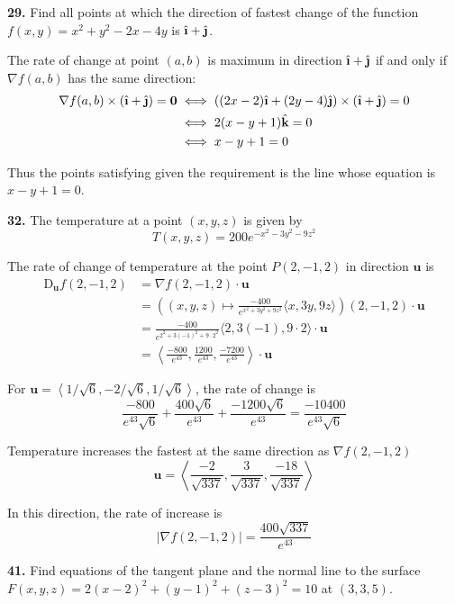 \documentclass[a4paper,12pt]{article}
\newcommand{\unit}[1]{\hat{\textbf #1}}
\newcommand{\exercise}[1]{\noindent\textbf{#1.}}
\begin{document}
\exercise{29} Find all points at which the direction of fastest change of the
function $f(x, y) = x^2 + y^2 - 2x - 4y$ is $\unit\i + \unit\j$.

The rate of change at point $(a, b)$ is maximum in direction $\unit\i + \unit\j$
if and only if $\nabla f(a, b)$ has the same direction:
\begin{align*}
  \nabla f(a, b) \times (\unit\i + \unit\j) = \mathbf{0}
&\iff ((2x-2)\unit\i + (2y-4)\unit\j) \times (\unit\i + \unit\j) = \mathrm{0}\\
&\iff 2(x - y + 1)\unit k = \mathrm{0}\\
&\iff x - y + 1 = 0
\end{align*}

Thus the points satisfying given the requirement is the line whose equation is
$x - y + 1 = 0$.

\exercise{32} The temperature at a point $(x, y, z)$ is given by
\[T(x, y, z) = 200e^{-x^2 - 3y^2 - 9z^2}\]

The rate of change of temperature at the point $P(2, -1, 2)$ in direction
$\mathbf{u}$ is
\begin{align*}
   \mathrm{D}_\mathbf{u}f(2, -1, 2)
&= \nabla f(2, -1, 2)\cdot\mathbf{u}\\
&= \left((x, y, z) \mapsto \frac{-400}{e^{x^2 + 3y^2 + 9z^2}}
         \langle x, 3y, 9z \rangle\right)(2, -1, 2)\cdot\mathbf{u}\\
&= \frac{-400}{e^{2^2 + 3(-1)^2 + 9 \cdot 2^2}}
   \langle 2, 3(-1), 9 \cdot 2 \rangle\cdot\mathbf{u}\\
&= \left<\frac{-800}{e^{43}}, \frac{1200}{e^{43}},
         \frac{-7200}{e^{43}}\right> \cdot \mathbf{u}
\end{align*}

For $\mathbf{u} = \left<1/\sqrt 6, -2/\sqrt 6, 1/\sqrt 6\right>$,
the rate of change is
\[\frac{-800}{e^{43}\sqrt 6} + \frac{400\sqrt 6}{e^{43}}
+ \frac{-1200\sqrt 6}{e^{43}} = \frac{-10400}{e^{43}\sqrt 6}\tag{a}\]

Temperature increases the fastest at the same direction as $\nabla f(2, -1, 2)$
\[\mathbf{u} = \left<\frac{-2}{\sqrt{337}}, \frac{3}{\sqrt{337}},
                     \frac{-18}{\sqrt{337}}\right>\tag{b}\]

In this direction, the rate of increase is
\[|\nabla f(2, -1, 2)| = \frac{400\sqrt{337}}{e^{43}}\tag{c}\]

\exercise{41} Find equations of the tangent plane and the normal line to the
surface $F(x, y, z) = 2(x - 2)^2 + (y - 1)^2 + (z - 3)^2 = 10$ at $(3, 3, 5)$.
\end{document}
